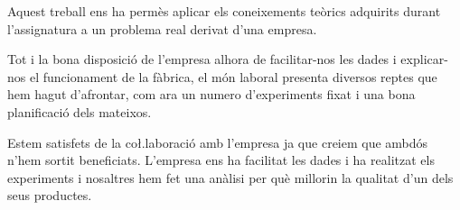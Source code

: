 \documentclass[a4paper]{article}
\begin{document}
Aquest treball ens ha permès aplicar els coneixements teòrics adquirits durant l’assignatura a un problema real derivat d’una empresa.

Tot i la bona disposició de l’empresa alhora de facilitar-nos les dades i explicar-nos el funcionament de la fàbrica, el món laboral presenta diversos reptes que hem hagut d’afrontar, com ara un numero d’experiments fixat i una bona planificació dels mateixos.

Estem satisfets de la co\l.laboració amb l’empresa ja que creiem que ambdós n’hem sortit beneficiats. L’empresa ens ha facilitat les dades i ha realitzat els experiments i nosaltres hem fet una anàlisi per què millorin la qualitat d’un dels seus productes.
\end{document}
